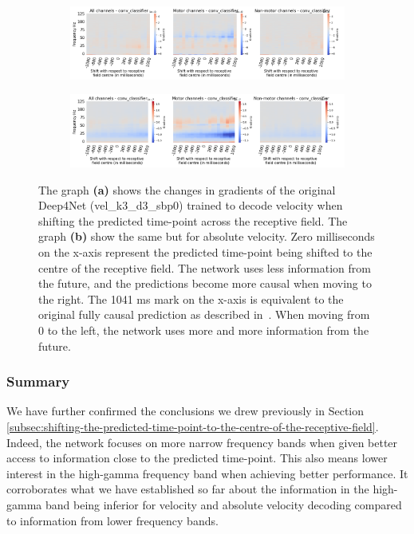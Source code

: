 \begin{figure}[!htbp]
\begin{subfigure}[a]{\textwidth}
   \includegraphics[width=1\linewidth]{img/appendix/C/m/vel/sbp0_m_shift_gradients_conv_classifier_all_kinds}
   \caption{}
   \label{fig:vel-shifting-gradients}
\end{subfigure}

\begin{subfigure}[b]{\textwidth}
   \includegraphics[width=1\linewidth]{img/appendix/C/m/absVel/sbp0_m_shift_gradients_conv_classifier_all_kinds}
   \caption{}
   \label{fig:absVel-shiftig-gradients}
\end{subfigure}
\caption[Gradual shifting - gradients]{The graph \textbf{(a)} shows the changes in gradients of the original Deep4Net (vel\_k3\_d3\_sbp0) trained to decode velocity when shifting the predicted time-point across the receptive field.
The graph \textbf{(b)} show the same but for absolute velocity. Zero milliseconds on the x-axis represent the predicted time-point being shifted to the centre of the receptive field.
The network uses less information from the future, and the predictions become more causal when moving to the right.
The 1041 ms mark on the x-axis is equivalent to the original fully causal prediction as described in~\cite{Hammer-2021}.
When moving from 0 to the left, the network uses more and more information from the future.}
\label{fig:shifting-gradients}
\end{figure}

\subsubsection{Summary}\label{subsubsec:across-shiftig-summary}
We have further confirmed the conclusions we drew previously in Section \ref{subsec:shifting-the-predicted-time-point-to-the-centre-of-the-receptive-field}. 
Indeed, the network focuses on more narrow frequency bands when given better access to information close to the predicted time-point.
This also means lower interest in the high-gamma frequency band when achieving better performance.
It corroborates what we have established so far about the information in the high-gamma band being inferior for velocity and absolute velocity decoding compared to information from lower frequency bands. 

